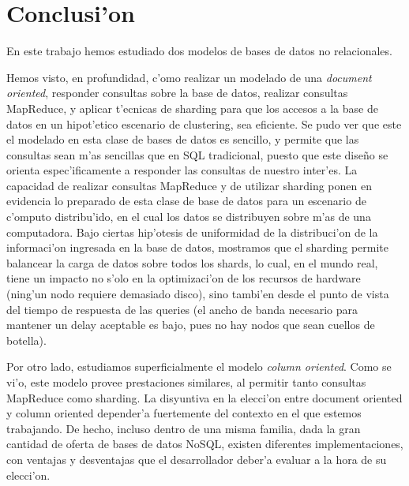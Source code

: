 \section{Conclusi'on}

En este trabajo hemos estudiado dos modelos de bases de datos no relacionales.

Hemos visto, en profundidad, c'omo realizar un modelado de una \textit{document oriented}, responder consultas sobre la base de datos, realizar consultas MapReduce, y aplicar t'ecnicas de sharding para que los accesos a la base de datos en un hipot'etico escenario de clustering, sea eficiente. Se pudo ver que este el modelado en esta clase de bases de datos es sencillo, y permite que las consultas sean m'as sencillas que en SQL tradicional, puesto que este dise\~no se orienta espec'ificamente a responder las consultas de nuestro inter'es. La capacidad de realizar consultas MapReduce y de utilizar sharding ponen en evidencia lo preparado de esta clase de base de datos para un escenario de c'omputo distribu'ido, en el cual los datos se distribuyen sobre m'as de una computadora. Bajo ciertas hip'otesis de uniformidad de la distribuci'on de la informaci'on ingresada en la base de datos, mostramos que el sharding permite balancear la carga de datos sobre todos los shards, lo cual, en el mundo real, tiene un impacto no s'olo en la optimizaci'on de los recursos de hardware (ning'un nodo requiere demasiado disco), sino tambi'en desde el punto de vista del tiempo de respuesta de las queries (el ancho de banda necesario para mantener un delay aceptable es bajo, pues no hay nodos que sean cuellos de botella).

Por otro lado, estudiamos superficialmente el modelo \textit{column oriented}. Como se vi'o, este modelo provee prestaciones similares, al permitir tanto consultas MapReduce como sharding. La disyuntiva en la elecci'on entre document oriented y column oriented depender'a fuertemente del contexto en el que estemos trabajando. De hecho, incluso dentro de una misma familia, dada la gran cantidad de oferta de bases de datos NoSQL, existen diferentes implementaciones, con ventajas y desventajas que el desarrollador deber'a evaluar a la hora de su elecci'on.
